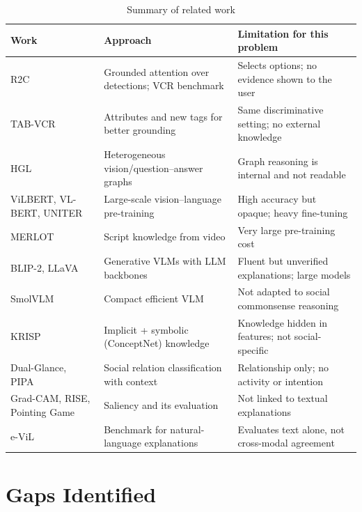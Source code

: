 \documentclass[12pt,a4paper,oneside]{report}
\renewcommand{\arraystretch}{1.15}
\begin{document}
\begin{table}[!htb]
\centering
\caption{Summary of related work}
\label{tab:litsummary}
\footnotesize
\renewcommand{\arraystretch}{1.25}
\begin{tabularx}{\textwidth}{@{}p{2.6cm}p{3.6cm}L@{}}
\toprule
\textbf{Work} & \textbf{Approach} & \textbf{Limitation for this problem}\\
\midrule
R2C~\cite{zellers2019vcr} & Grounded attention over detections; VCR benchmark & Selects options; no evidence shown to the user \\
TAB-VCR~\cite{lin2019tabvcr} & Attributes and new tags for better grounding & Same discriminative setting; no external knowledge \\
HGL~\cite{yu2019hgl} & Heterogeneous vision/question--answer graphs & Graph reasoning is internal and not readable \\
ViLBERT, VL-BERT, UNITER~\cite{lu2019vilbert,su2020vlbert,chen2020uniter} & Large-scale vision--language pre-training & High accuracy but opaque; heavy fine-tuning \\
MERLOT~\cite{zellers2021merlot} & Script knowledge from video & Very large pre-training cost \\
BLIP-2, LLaVA~\cite{li2023blip2,liu2023llava} & Generative VLMs with LLM backbones & Fluent but unverified explanations; large models \\
SmolVLM~\cite{marafioti2025smolvlm} & Compact efficient VLM & Not adapted to social commonsense reasoning \\
KRISP~\cite{marino2021krisp} & Implicit + symbolic (ConceptNet) knowledge & Knowledge hidden in features; not social-specific \\
Dual-Glance, PIPA~\cite{li2017dualglance,sun2017domain} & Social relation classification with context & Relationship only; no activity or intention \\
Grad-CAM, RISE, Pointing Game~\cite{selvaraju2017gradcam,petsiuk2018rise,zhang2018excitation} & Saliency and its evaluation & Not linked to textual explanations \\
e-ViL~\cite{kayser2021evil} & Benchmark for natural-language explanations & Evaluates text alone, not cross-modal agreement \\
\bottomrule
\end{tabularx}
\end{table}

\section{Gaps Identified}
\end{document}
